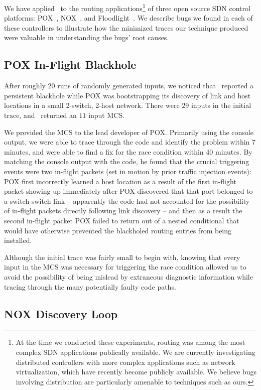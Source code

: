 We have applied \projectname~to the routing applications\footnote{At the time
we conducted these experiments, routing was among the most complex
SDN applications publically available. We are currently investigating
distributed controllers with more complex applications such as network virtualization,
which have recently become publicly available. We believe bugs involving
distribution are particularly amenable to techniques such as ours.} of three open
source SDN control platforms:
POX~\cite{pox}, NOX~\cite{nox}, and Floodlight~\cite{bigswitch}. We describe
bugs we found in each of these controllers to illustrate
how the minimized traces our technique produced were valuable in
understanding the bugs' root causes.

\subsection{POX In-Flight Blackhole}
After roughly 20 runs of randomly generated inputs,
we noticed that \projectname~reported a persistent blackhole while
POX was bootstrapping its
discovery of link and host locations in a small 2-switch, 2-host network.
There were $29$ inputs in the initial trace, and \projectname~returned an $11$ input
MCS.

We provided the MCS to the lead developer of POX. Primarily using the
console output, we were able to trace through the code and identify the problem
within 7 minutes, and were able to find a fix for the race condition within 40
minutes. By matching the console output with the code, he found that the crucial
triggering events were two
in-flight packets (set in motion by prior traffic injection events):
POX first incorrectly learned a host location as a result of the first in-flight
packet showing up immediately after POX discovered that that port belonged to
a switch-switch link -- apparently the code had not accounted for the
possibility of in-flight packets directly following link discovery -- and
then as a result the
second in-flight packet
POX failed to return out of a nested conditional that would have
otherwise prevented the blackholed routing entries from being installed.

Although the initial trace was fairly small to begin with, knowing that every
input in the MCS was necessary for triggering the race condition allowed us to
avoid the
possibility of being mislead by extraneous diagnostic information while
tracing through the many potentially faulty code paths.

\subsection{NOX Discovery Loop}

